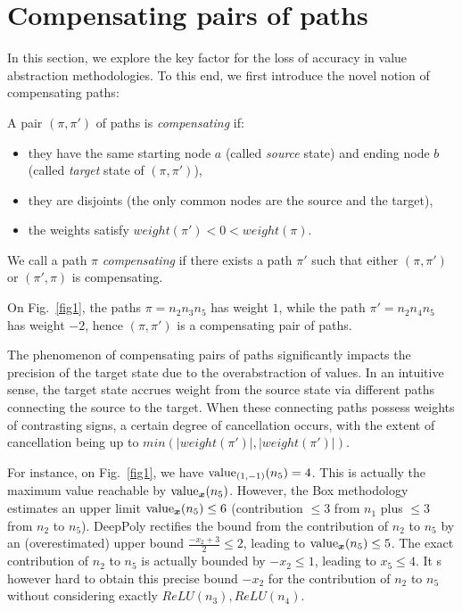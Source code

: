 
\section{Compensating pairs of paths}
\label{Sec.comp}

In this section, we explore the key factor for the loss of accuracy in value 
abstraction methodologies. To this end, we first introduce the novel notion of compensating paths:

\begin{definition}
A pair $(\pi,\pi')$ of paths is {\em compensating} if:
\begin{itemize}
	\item they have the same starting node $a$ (called {\em source} state) and ending node $b$ (called {\em target} state of $(\pi,\pi')$),
	\item they are disjoints (the only common nodes are the source and the target),
	\item the weights satisfy $weight(\pi') < 0 < weight(\pi)$.
\end{itemize}	
We call a path $\pi$ {\em compensating} if there exists a path $\pi'$ such that either $(\pi,\pi')$ or $(\pi',\pi)$ is compensating.
\end{definition}

\begin{example}
	On Fig.~\ref{fig1}, the paths $\pi= n_2 n_3 n_5$ has weight $1$, while the
	path $\pi'= n_2 n_4 n_5$ has weight $-2$, hence $(\pi,\pi')$ is a compensating pair of paths.
	\end{example}


	The phenomenon of compensating pairs of paths significantly impacts the precision of the target state due to the overabstraction of values. In an intuitive sense, the target state accrues weight from the source state via different paths connecting the source to the target. When these connecting paths possess weights of contrasting signs, a certain degree of cancellation occurs, with the extent of cancellation being up to $min(|weight(\pi')|,|weight(\pi')|)$.

	For instance, on Fig.~\ref{fig1}, we have ${\textrm{value}}_{(1,-1)}(n_5)=4$. 
This is actually the maximum value reachable by ${\textrm{value}}_{\boldsymbol{x}}(n_5)$. However, the Box methodology estimates an upper limit ${\textrm{value}}_{\boldsymbol{x}}(n_5) \leq 6$ (contribution $\leq 3$ from $n_1$ plus $\leq 3$ from $n_2$ to $n_5$). 
DeepPoly rectifies the bound from the contribution of $n_2$ to $n_5$ by an (overestimated) upper bound $\frac{-x_2+3}{2} \leq 2$, leading to ${\textrm{value}}_{\boldsymbol{x}}(n_5) \leq 5$. 
The exact contribution of $n_2$ to $n_5$ is actually bounded by $-x_2 \leq 1$, leading to $x_5 \leq 4$. 
It s however hard to obtain this precise bound $-x_2$ for the contribution of $n_2$ to $n_5$
without considering exactly $ReLU(n_3),ReLU(n_4)$.

